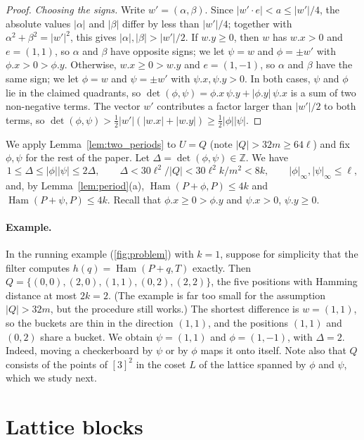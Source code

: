 \documentclass[11pt]{article}
\theoremstyle{definition}
\newcommand{\Z}{\mathbb{Z}}
\DeclareMathOperator{\Ham}{Ham}
\newcommand{\abs}[1]{\lvert #1 \rvert}
\newcommand{\inorm}[1]{\lvert #1 \rvert_\infty}
\newcommand{\x}[1]{#1.x}
\newcommand{\y}[1]{#1.y}
\begin{document}
\begin{proof}
\emph{Choosing the signs.}
Write $w' = (\alpha, \beta)$.
Since $\abs{w' \cdot e} < a \le \abs{w'}/4$, the absolute values $\abs{\alpha}$ and $\abs{\beta}$ differ by less than $\abs{w'}/4$; together with $\alpha^2 + \beta^2 = \abs{w'}^2$, this gives $\abs\alpha, \abs\beta > \abs{w'}/2$.
If $\y w \ge 0$, then $w$ has $\x w > 0$ and $e = (1,1)$, so $\alpha$ and $\beta$ have opposite signs; we let $\psi = w$ and $\phi = \pm w'$ with $\x\phi > 0 > \y\phi$.
Otherwise, $\x w \ge 0 > \y w$ and $e = (1,-1)$, so $\alpha$ and $\beta$ have the same sign; we let $\phi = w$ and $\psi = \pm w'$ with $\x\psi, \y\psi > 0$.
In both cases, $\psi$ and $\phi$ lie in the claimed quadrants, so $\det(\phi,\psi) = \x\phi\,\y\psi + \abs{\y\phi}\,\x\psi$ is a sum of two non-negative terms.
The vector $w'$ contributes a factor larger than $\abs{w'}/2$ to both terms, so $\det(\phi,\psi) > \frac12\abs{w'}(\abs{\x w} + \abs{\y w}) \ge \frac12\abs{\phi}\abs{\psi}$.
\end{proof}

We apply Lemma~\ref{lem:two_periods} to $U = Q$ (note $\abs{Q} > 32m \ge 64\ell$) and fix $\phi, \psi$ for the rest of the paper.
Let $\Delta = \det(\phi,\psi) \in \Z$.
We have
\[ 1 \le \Delta \le \abs{\phi}\abs{\psi} \le 2\Delta, \qquad \Delta < 30\ell^2/\abs{Q} < 30 \ell^2 k / m^2 < 8k,\qquad \inorm{\phi}, \inorm{\psi} \le \ell, \]
and, by Lemma~\ref{lem:period}(a), $\Ham(P + \phi, P) \le 4k$ and $\Ham(P + \psi, P) \le 4k$.
Recall that $\x\phi \ge 0 > \y\phi$ and $\x\psi > 0$, $\y\psi \ge 0$.

\paragraph{Example.}
In the running example (\autoref{fig:problem}) with $k = 1$, suppose for simplicity that the filter computes $h(q) = \Ham(P+q,T)$ exactly.
Then $Q = \{(0,0), (2,0), (1,1), (0,2), (2,2)\}$, the five positions with Hamming distance at most $2k = 2$.
(The example is far too small for the assumption $\abs{Q} > 32m$, but the procedure still works.)
The shortest difference is $w = (1,1)$, so the buckets are thin in the direction $(1,1)$, and the positions $(1,1)$ and $(0,2)$ share a bucket.
We obtain $\psi = (1,1)$ and $\phi = (1,-1)$, with $\Delta = 2$.
Indeed, moving a checkerboard by $\psi$ or by $\phi$ maps it onto itself.
Note also that $Q$ consists of the points of $[3]^2$ in the coset $L$ of the lattice spanned by $\phi$ and $\psi$, which we study next.

\section{Lattice blocks}
\label{sec:lattice}
\end{document}

